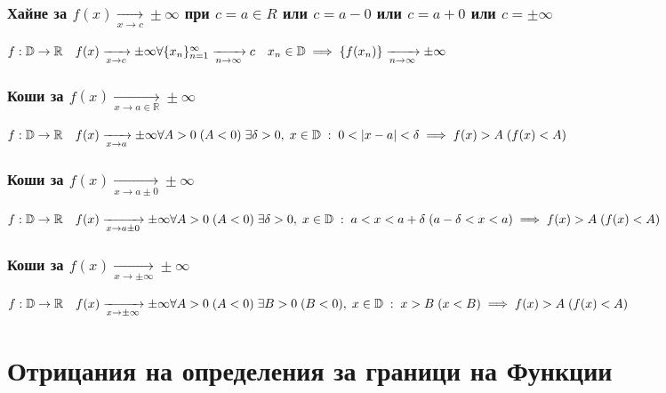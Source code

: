 \documentclass[12pt]{article}
\newcommand{\pto}[2]{\xrightarrow[#1 \to #2]{}}
\newcommand{\xto}[1]{\pto{x}{#1}}
\newcommand{\nto}{\pto{n}{\infty}}
\newcommand{\R}{\mathbb{R}}
\newcommand{\D}{\mathbb{D}}
\newcommand{\spc}{\quad}
\newcommand{\seq}[1]{\{#1_n\}_{n=1}^{\infty}}
\begin{document}
\subsubsection*{Хайне за \(f(x) \xto{c} \pm \infty\) при \(c = a \in R\) или \(c = a - 0\) или \(c = a + 0\) или \(c = \pm \infty\)}
\(f: \D \to \R \spc f(x) \xto{c} \pm \infty\\
\forall \seq{x} \nto c \spc x_n \in \D\\
\implies \{f(x_n)\} \nto \pm \infty\)

\subsubsection*{Коши за \(f(x) \xto{a \in \R} \pm \infty\)}
\(f: \D \to \R \spc f(x) \xto{a} \pm \infty\\
\forall A > 0 \; (A < 0) \; \exists \delta > 0, \; x \in \D \; : \; 0 < |x - a| < \delta\\
\implies f(x) > A \; (f(x) < A)\)

\subsubsection*{Коши за \(f(x) \xto{a \pm 0} \pm \infty\)}
\(f: \D \to \R \spc f(x) \xto{a \pm 0} \pm \infty\\
\forall A > 0 \; (A < 0) \; \exists \delta > 0, \; x \in \D \; : \; a < x < a + \delta \; (a - \delta < x < a)\\
\implies f(x) > A \; (f(x) < A)\)

\subsubsection*{Коши за \(f(x) \xto{\pm \infty} \pm \infty\)}
\(f: \D \to \R \spc f(x) \xto{\pm \infty} \pm \infty\\
\forall A > 0 \; (A < 0) \; \exists B > 0 \; (B < 0), \; x \in \D \; : \; x > B \; (x < B)\\
\implies f(x) > A \; (f(x) < A)\)

\section*{Отрицания на определения за граници на Функции}
\end{document}
